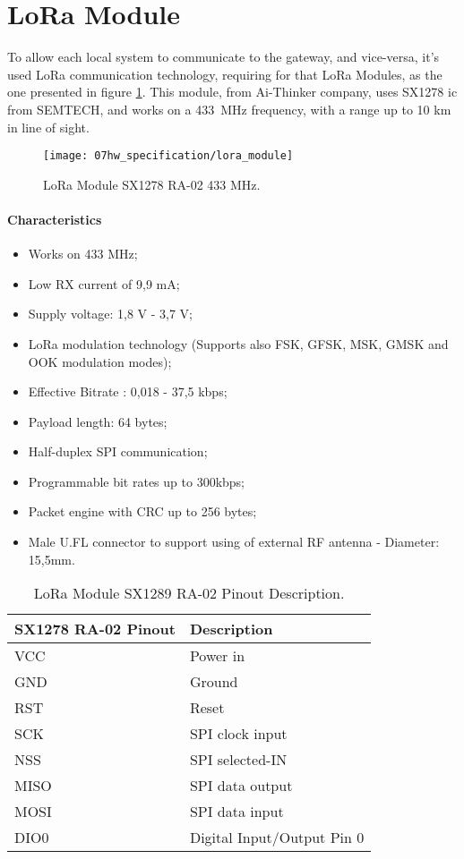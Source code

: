 \clearpage
\section{LoRa Module}
To allow each local system to communicate to the gateway, and vice-versa, it's used LoRa communication technology, requiring for that LoRa Modules, as the one presented in figure \ref{fig:lora_module}. This module, from Ai-Thinker company, uses SX1278 \ac{ic} from SEMTECH, and works on a 433~MHz frequency, with a range up to 10 km in line of sight. \cite{sx1278} \cite{lora_module}

\begin{figure}[H]
	\centering
	\texttt{[image: 07hw\_specification/lora\_module]}
	\caption{LoRa Module SX1278 RA-02 433 MHz.}
	\label{fig:lora_module}
\end{figure}

\paragraph*{Characteristics}
\begin{itemize}
	\item Works on 433 MHz;
	\item Low RX current of 9,9 mA;
	\item Supply voltage: 1,8 V - 3,7 V;
	\item LoRa modulation technology (Supports also FSK, GFSK, MSK, GMSK and OOK modulation modes);
	\item Effective Bitrate : 0,018 - 37,5 kbps;
	\item Payload length: 64 bytes;
	\item Half-duplex SPI communication;
	\item Programmable bit rates up to 300kbps;
	\item Packet engine with CRC up to 256 bytes;
	\item Male U.FL connector to support using of external RF antenna - Diameter: 15,5mm.
\end{itemize}

\begin{table}[H]
	\centering
		\begin{tabular}{|m{5cm}|m{6cm}|}
			\hline
			\textbf{SX1278 RA-02 Pinout} & \textbf{Description}
			\\\hline\hline
		
			VCC & Power in\\\hline
			GND & Ground\\\hline
			RST & Reset \\\hline
			SCK & SPI clock input\\\hline
			NSS & SPI selected-IN\\\hline
			MISO & SPI data output\\\hline
			MOSI & SPI data input\\\hline
			DIO0 & Digital Input/Output Pin 0\\\hline
		\end{tabular}
	
	\caption{LoRa Module SX1289 RA-02 Pinout Description.}
	\label{table:lora_module_pinout}
\end{table}

